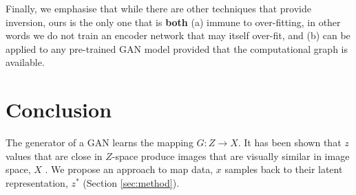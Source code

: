 \documentclass[journal]{IEEEtran}
\begin{document}
Finally, we emphasise that while there are other techniques that provide inversion, ours is the only one that is \textbf{both} (a) immune to over-fitting, in other words we do not train an encoder network that may itself over-fit, and (b) can be applied to any pre-trained GAN model provided that the computational graph is available.













\section{Conclusion}

The generator of a GAN learns the mapping $G: Z \rightarrow X$. It has been shown that $z$ values that are close in $Z$-space produce images that are visually similar in image space, $X$ \cite{radford2015unsupervised}. We propose an approach to map data, $x$ samples back to their latent representation, $z^*$ (Section \ref{sec:method}).
\end{document}
